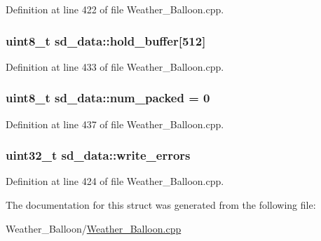 Definition at line 422 of file Weather\+\_\+\+Balloon.\+cpp.

\subsubsection[{\texorpdfstring{hold\+\_\+buffer}{hold\_buffer}}]{\setlength{\rightskip}{0pt plus 5cm}uint8\+\_\+t sd\+\_\+data\+::hold\+\_\+buffer\mbox{[}512\mbox{]}}\hypertarget{structsd__data_a8c7d8aeb42db3bbd384026be5d5e0bbd}{}\label{structsd__data_a8c7d8aeb42db3bbd384026be5d5e0bbd}


Definition at line 433 of file Weather\+\_\+\+Balloon.\+cpp.

\subsubsection[{\texorpdfstring{num\+\_\+packed}{num\_packed}}]{\setlength{\rightskip}{0pt plus 5cm}uint8\+\_\+t sd\+\_\+data\+::num\+\_\+packed = 0}\hypertarget{structsd__data_ada768338826445661ce665fc7bb9b8a0}{}\label{structsd__data_ada768338826445661ce665fc7bb9b8a0}


Definition at line 437 of file Weather\+\_\+\+Balloon.\+cpp.

\subsubsection[{\texorpdfstring{write\+\_\+errors}{write\_errors}}]{\setlength{\rightskip}{0pt plus 5cm}uint32\+\_\+t sd\+\_\+data\+::write\+\_\+errors}\hypertarget{structsd__data_ac1410d5750aa9c7a30041b0ac94cbc80}{}\label{structsd__data_ac1410d5750aa9c7a30041b0ac94cbc80}


Definition at line 424 of file Weather\+\_\+\+Balloon.\+cpp.



The documentation for this struct was generated from the following file\+:\begin{DoxyCompactItemize}
\item 
Weather\+\_\+\+Balloon/\hyperlink{_weather___balloon_8cpp}{Weather\+\_\+\+Balloon.\+cpp}\end{DoxyCompactItemize}
